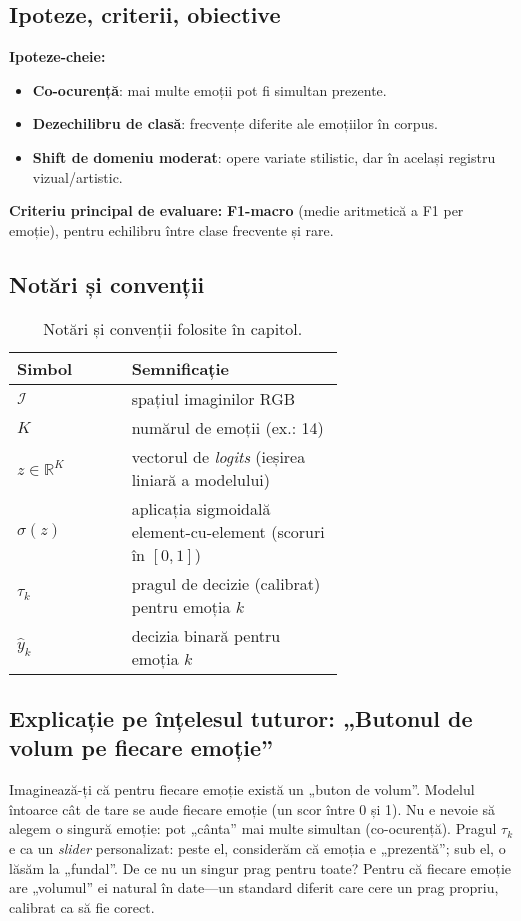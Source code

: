 \subsection{Ipoteze, criterii, obiective}
\noindent\textbf{Ipoteze-cheie:}
\begin{itemize}
  \item \textbf{Co-ocurență}: mai multe emoții pot fi simultan prezente.
  \item \textbf{Dezechilibru de clasă}: frecvențe diferite ale emoțiilor în corpus.
  \item \textbf{Shift de domeniu moderat}: opere variate stilistic, dar în același registru vizual/artistic.
\end{itemize}

\noindent\textbf{Criteriu principal de evaluare:} \textbf{F1-macro} (medie aritmetică a F1 per emoție), pentru echilibru între clase frecvente și rare.

\subsection{Notări și convenții}
\begin{table}[h]
\centering
\begin{tabular}{l p{0.65\linewidth}}
\hline
\textbf{Simbol} & \textbf{Semnificație} \\
\hline
$\mathcal{I}$ & spațiul imaginilor RGB \\
$K$ & numărul de emoții (ex.: 14) \\
$z\in\mathbb{R}^K$ & vectorul de \emph{logits} (ieșirea liniară a modelului) \\
$\sigma(z)$ & aplicația sigmoidală element-cu-element (scoruri în $[0,1]$) \\
$\tau_k$ & pragul de decizie (calibrat) pentru emoția $k$ \\
$\hat{y}_k$ & decizia binară pentru emoția $k$ \\
\hline
\end{tabular}
\caption{Notări și convenții folosite în capitol.}
\label{tab:notatii}
\end{table}

\subsection{Explicație pe înțelesul tuturor: „Butonul de volum pe fiecare emoție”}
Imaginează-ți că pentru fiecare emoție există un „buton de volum”. Modelul întoarce cât de tare se aude fiecare emoție (un scor între 0 și 1). Nu e nevoie să alegem o singură emoție: pot „cânta” mai multe simultan (co-ocurență). Pragul $\tau_k$ e ca un \emph{slider} personalizat: peste el, considerăm că emoția e „prezentă”; sub el, o lăsăm la „fundal”. De ce nu un singur prag pentru toate? Pentru că fiecare emoție are „volumul” ei natural în date—un standard diferit care cere un prag propriu, calibrat ca să fie corect.


